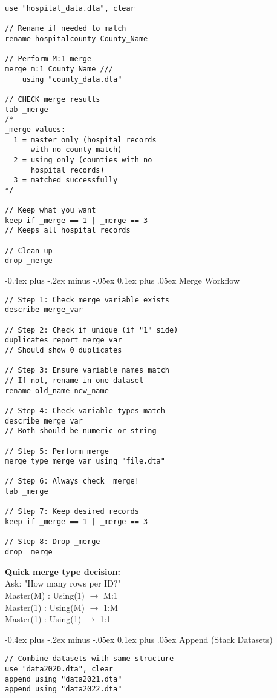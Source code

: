 \documentclass[8pt,landscape,a4paper]{article}
\makeatletter
\renewcommand{\subsection}{\@startsection{subsection}{2}{0mm}%
                                {-0.4ex plus -.2ex minus -.05ex}%
                                {0.1ex plus .05ex}%
                                {\normalfont\fontsize{7.5pt}{7.5pt}\selectfont\bfseries\color{myblue}}}
\makeatother
\begin{document}
\begin{multicols}{3}
\begin{lstlisting}
use "hospital_data.dta", clear

// Rename if needed to match
rename hospitalcounty County_Name

// Perform M:1 merge
merge m:1 County_Name ///
    using "county_data.dta"

// CHECK merge results
tab _merge
/*
_merge values:
  1 = master only (hospital records
      with no county match)
  2 = using only (counties with no
      hospital records)
  3 = matched successfully
*/

// Keep what you want
keep if _merge == 1 | _merge == 3
// Keeps all hospital records

// Clean up
drop _merge
\end{lstlisting}

\subsection{Merge Workflow}
\begin{lstlisting}
// Step 1: Check merge variable exists
describe merge_var

// Step 2: Check if unique (if "1" side)
duplicates report merge_var
// Should show 0 duplicates

// Step 3: Ensure variable names match
// If not, rename in one dataset
rename old_name new_name

// Step 4: Check variable types match
describe merge_var
// Both should be numeric or string

// Step 5: Perform merge
merge type merge_var using "file.dta"

// Step 6: Always check _merge!
tab _merge

// Step 7: Keep desired records
keep if _merge == 1 | _merge == 3

// Step 8: Drop _merge
drop _merge
\end{lstlisting}

\begin{tipbox}
\textbf{Quick merge type decision:}\\
Ask: "How many rows per ID?"\\
Master(M) : Using(1) $\rightarrow$ M:1\\
Master(1) : Using(M) $\rightarrow$ 1:M\\
Master(1) : Using(1) $\rightarrow$ 1:1
\end{tipbox}

\subsection{Append (Stack Datasets)}
\begin{lstlisting}
// Combine datasets with same structure
use "data2020.dta", clear
append using "data2021.dta"
append using "data2022.dta"


\end{lstlisting}
\end{multicols}
\end{document}
